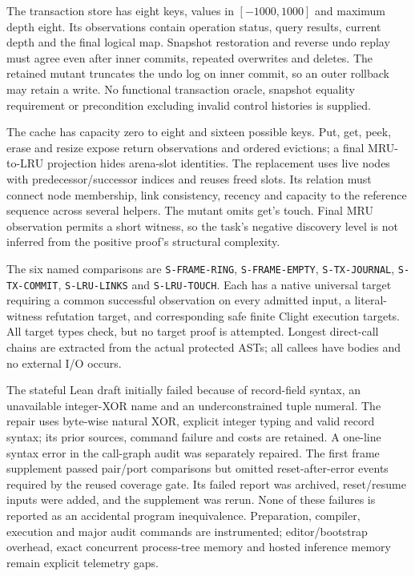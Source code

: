 \documentclass{article}
\begin{document}
The transaction store has eight keys, values in $[-1000,1000]$ and maximum depth eight. Its observations contain operation status, query results, current depth and the final logical map. Snapshot restoration and reverse undo replay must agree even after inner commits, repeated overwrites and deletes. The retained mutant truncates the undo log on inner commit, so an outer rollback may retain a write. No functional transaction oracle, snapshot equality requirement or precondition excluding invalid control histories is supplied.

The cache has capacity zero to eight and sixteen possible keys. Put, get, peek, erase and resize expose return observations and ordered evictions; a final MRU-to-LRU projection hides arena-slot identities. The replacement uses live nodes with predecessor/successor indices and reuses freed slots. Its relation must connect node membership, link consistency, recency and capacity to the reference sequence across several helpers. The mutant omits get's touch. Final MRU observation permits a short witness, so the task's negative discovery level is not inferred from the positive proof's structural complexity.

The six named comparisons are \texttt{S-FRAME-RING}, \texttt{S-FRAME-EMPTY}, \texttt{S-TX-JOURNAL}, \texttt{S-TX-COMMIT}, \texttt{S-LRU-LINKS} and \texttt{S-LRU-TOUCH}. Each has a native universal target requiring a common successful observation on every admitted input, a literal-witness refutation target, and corresponding safe finite Clight execution targets. All target types check, but no target proof is attempted. Longest direct-call chains are extracted from the actual protected ASTs; all callees have bodies and no external I/O occurs.

The stateful Lean draft initially failed because of record-field syntax, an unavailable integer-XOR name and an underconstrained tuple numeral. The repair uses byte-wise natural XOR, explicit integer typing and valid record syntax; its prior sources, command failure and costs are retained. A one-line syntax error in the call-graph audit was separately repaired. The first frame supplement passed pair/port comparisons but omitted reset-after-error events required by the reused coverage gate. Its failed report was archived, reset/resume inputs were added, and the supplement was rerun. None of these failures is reported as an accidental program inequivalence. Preparation, compiler, execution and major audit commands are instrumented; editor/bootstrap overhead, exact concurrent process-tree memory and hosted inference memory remain explicit telemetry gaps.
\end{document}
